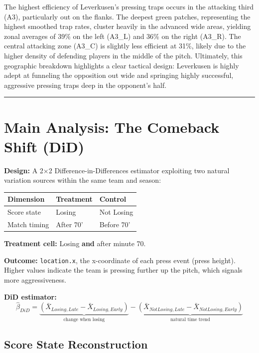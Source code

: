 \documentclass[
]{article}
\begin{document}
The highest efficiency of Leverkusen's pressing traps occurs in the
attacking third (A3), particularly out on the flanks. The deepest green
patches, representing the highest smoothed trap rates, cluster heavily
in the advanced wide areas, yielding zonal averages of 39\% on the left
(A3\_L) and 36\% on the right (A3\_R). The central attacking zone
(A3\_C) is slightly less efficient at 31\%, likely due to the higher
density of defending players in the middle of the pitch. Ultimately,
this geographic breakdown highlights a clear tactical design: Leverkusen
is highly adept at funneling the opposition out wide and springing
highly successful, aggressive pressing traps deep in the opponent's
half.

\begin{center}\rule{0.5\linewidth}{0.5pt}\end{center}

\section{Main Analysis: The Comeback Shift
(DiD)}\label{main-analysis-the-comeback-shift-did}

\textbf{Design:} A 2×2 Difference-in-Differences estimator exploiting
two natural variation sources within the same team and season:

{\def\LTcaptype{} %
\begin{longtable}[]{@{}lll@{}}
\toprule\noalign{}
Dimension & Treatment & Control \\
\midrule\noalign{}
\endhead
\bottomrule\noalign{}
\endlastfoot
Score state & Losing & Not Losing \\
Match timing & After 70' & Before 70' \\
\end{longtable}
}

\textbf{Treatment cell:} Losing \textbf{and} after minute 70.

\textbf{Outcome:} \texttt{location.x}, the x-coordinate of each press
event (press height). Higher values indicate the team is pressing
further up the pitch, which signals more aggressiveness.

\textbf{DiD estimator:}
\[\hat{\beta}_{DiD} = \underbrace{(\bar{X}_{Losing,Late} - \bar{X}_{Losing,Early})}_{\text{change when losing}} - \underbrace{(\bar{X}_{NotLosing,Late} - \bar{X}_{NotLosing,Early})}_{\text{natural time trend}}\]

\subsection{Score State
Reconstruction}\label{score-state-reconstruction}
\end{document}
